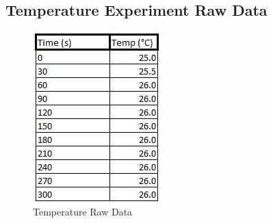 \subsection{Temperature Experiment Raw Data}\begin{figure}[H]
    \includegraphics[width=\textwidth]{./preliminarywork/images/TemperatureRawData.jpg}
    \caption{Temperature Raw Data} \label{fig:TemperatureRawData}
\end{figure}

	